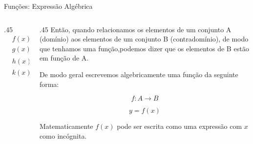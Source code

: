 \documentclass[aspectratio=169, t, 8pt]{beamer}
\DeclareMathOperator{\sen}{sen}
\begin{document}
    \begin{frame}{Funções: Expressão Algébrica}
       \begin{columns}[totalwidth=.9\textwidth]
         \begin{column}{.45\textwidth}
            \large\[
                \begin{aligned}
                    &f(x) = x + 2\\
                    &g(x) = \sen{(x+2)}\\
                    &h(x) = (x+2)^3 \\
                    &k(x) = k^2 + 2k + 4
                \end{aligned}
            \]
        \end{column}
        \begin{column}{.45 \textwidth}
            Então, quando relacionamos os elementos de um conjunto A (domínio) aos elementos de um conjunto B (contradomínio), de modo que tenhamos uma função,podemos dizer que os elementos de B estão em função de A.

            De modo geral escrevemos algebricamente uma função da seguinte forma:

            \vspace{1.2em}

                {\large
                \[
                    f: A \rightarrow B
                \]}

                {\large
                \[
                    y = f(x)
                \]
                }

            Matematicamente $f(x)$ pode ser escrita como uma expressão com $x$ como incógnita.
        \end{column}
       \end{columns}
    \end{frame}
\end{document}
